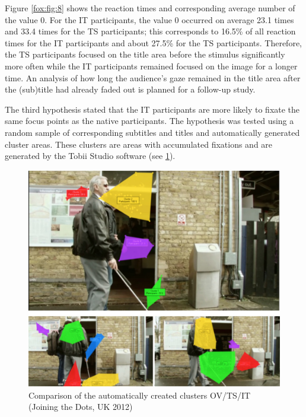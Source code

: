 \documentclass[output=paper]{langsci/langscibook}
\begin{document}
Figure \ref{fox:fig:8} shows the reaction times and corresponding average number of the value 0. For the IT participants, the value 0 occurred on average 23.1 times and 33.4 times for the TS participants; this corresponds to 16.5\% of all reaction times for the IT participants and about 27.5\% for the TS participants. Therefore, the TS participants focused on the title area before the stimulus significantly more often while the IT participants remained focused on the image for a longer time. An analysis of how long the audience’s gaze remained in the title area after the (sub)title had already faded out is planned for a follow-up study.



The third hypothesis stated that the IT participants are more likely to fixate the same focus points as the native participants. The hypothesis was tested using a random sample of corresponding subtitles and titles and automatically generated cluster areas. These clusters are areas with accumulated fixations and are generated by the Tobii Studio software (see \ref{fox:fig:9}).


\begin{figure} 
  \includegraphics[height=.3\textheight]{figures/Fox9.png}
  \caption{Comparison of the automatically created clusters OV/TS/IT (Joining the Dots, UK 2012)}
  \label{fox:fig:9}
\end{figure}
\end{document}
